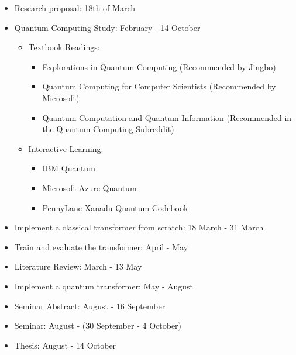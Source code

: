 \begin{itemize}
    \setlength{
  \itemsep}{-1ex}
  \item Research proposal: 18th of March
  \item Quantum Computing Study: February - 14 October
    \begin{itemize}
        \setlength{
      \itemsep}{-1ex}
      \item Textbook Readings:
        \begin{itemize}
          \item Explorations in Quantum Computing (Recommended by Jingbo)
          \item Quantum Computing for Computer Scientists
            (Recommended by Microsoft)
          \item Quantum Computation and Quantum Information
            (Recommended in the Quantum Computing Subreddit)
        \end{itemize}
      \item Interactive Learning:
        \begin{itemize}
          \item IBM Quantum
          \item Microsoft Azure Quantum
          \item PennyLane Xanadu Quantum Codebook
        \end{itemize}
    \end{itemize}
  \item Implement a classical transformer from scratch: 18 March - 31 March
  \item Train and evaluate the transformer: April - May
  \item Literature Review: March - 13 May
  \item Implement a quantum transformer: May - August
  \item Seminar Abstract: August - 16 September
  \item Seminar: August - (30 September - 4 October)
  \item Thesis: August - 14 October
\end{itemize}
